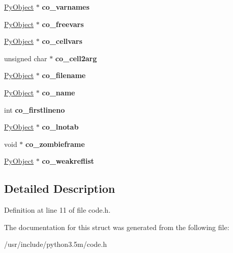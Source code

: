 \begin{DoxyCompactItemize}
\item 
\hyperlink{struct__object}{Py\+Object} $\ast$ {\bfseries co\+\_\+varnames}\hypertarget{structPyCodeObject_aff29dff0e2f511c562f3bc9a322321d0}{}\label{structPyCodeObject_aff29dff0e2f511c562f3bc9a322321d0}

\item 
\hyperlink{struct__object}{Py\+Object} $\ast$ {\bfseries co\+\_\+freevars}\hypertarget{structPyCodeObject_a89e2b8f2d3e34ce6b6a866da47c5ddbb}{}\label{structPyCodeObject_a89e2b8f2d3e34ce6b6a866da47c5ddbb}

\item 
\hyperlink{struct__object}{Py\+Object} $\ast$ {\bfseries co\+\_\+cellvars}\hypertarget{structPyCodeObject_ab08cf541a92d6fc56af2cc1419816e23}{}\label{structPyCodeObject_ab08cf541a92d6fc56af2cc1419816e23}

\item 
unsigned char $\ast$ {\bfseries co\+\_\+cell2arg}\hypertarget{structPyCodeObject_a6a86b742cd6fc52c6b8f3e1bf7584261}{}\label{structPyCodeObject_a6a86b742cd6fc52c6b8f3e1bf7584261}

\item 
\hyperlink{struct__object}{Py\+Object} $\ast$ {\bfseries co\+\_\+filename}\hypertarget{structPyCodeObject_a15d8ea3dbc511eccdafc0cc0743632aa}{}\label{structPyCodeObject_a15d8ea3dbc511eccdafc0cc0743632aa}

\item 
\hyperlink{struct__object}{Py\+Object} $\ast$ {\bfseries co\+\_\+name}\hypertarget{structPyCodeObject_a10bd7a8a3f23047cdb6eb10e032176bf}{}\label{structPyCodeObject_a10bd7a8a3f23047cdb6eb10e032176bf}

\item 
int {\bfseries co\+\_\+firstlineno}\hypertarget{structPyCodeObject_a068116d5abe3d1803aec12f31a638234}{}\label{structPyCodeObject_a068116d5abe3d1803aec12f31a638234}

\item 
\hyperlink{struct__object}{Py\+Object} $\ast$ {\bfseries co\+\_\+lnotab}\hypertarget{structPyCodeObject_ac99c01e278a9cabed14aac6713f18bf6}{}\label{structPyCodeObject_ac99c01e278a9cabed14aac6713f18bf6}

\item 
void $\ast$ {\bfseries co\+\_\+zombieframe}\hypertarget{structPyCodeObject_ac08ff386d0019fdf3a6b455ca1e53ff9}{}\label{structPyCodeObject_ac08ff386d0019fdf3a6b455ca1e53ff9}

\item 
\hyperlink{struct__object}{Py\+Object} $\ast$ {\bfseries co\+\_\+weakreflist}\hypertarget{structPyCodeObject_a0240509a49ab73c5e157dc75c2ae88d7}{}\label{structPyCodeObject_a0240509a49ab73c5e157dc75c2ae88d7}

\end{DoxyCompactItemize}


\subsection{Detailed Description}


Definition at line 11 of file code.\+h.



The documentation for this struct was generated from the following file\+:\begin{DoxyCompactItemize}
\item 
/usr/include/python3.\+5m/code.\+h\end{DoxyCompactItemize}
